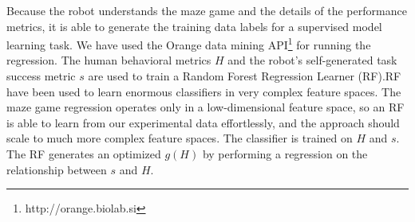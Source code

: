 \documentclass{sig-alternate}
\begin{document}
Because the robot understands the maze game and the details of the
performance metrics, it is able to generate the training data labels
for a supervised model learning task.  We have used the Orange data
mining API\footnote{http://orange.biolab.si} for running the regression.  The human behavioral metrics $H$ and the robot's self-generated task success metric $s$ are used to train a Random Forest Regression Learner (RF).RF have been used to learn enormous classifiers in very complex feature spaces. The maze game regression operates only in a low-dimensional feature space, so an RF is able to learn from our experimental data effortlessly, and the approach should scale to much more complex feature spaces.  The classifier is trained
on $H$ and $s$.  The RF generates an optimized $g(H)$ by performing a regression on the relationship between $s$ and $H$.

\end{document}

